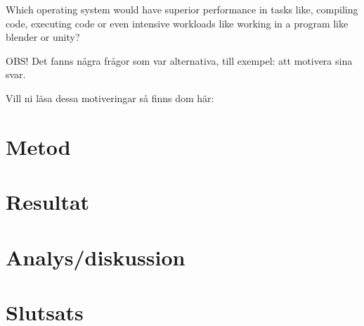 \documentclass[a4paper, 12pt]{report}
\begin{document}
    \cite{form}
    \vspace{1cm}

    \large {Which operating system would have superior performance in tasks like, compiling code, executing code or even intensive workloads like working in a program  like blender or unity?}

    \vspace{.5cm}



    \cite{form}

    \vspace{1cm}


    \small{OBS! Det fanns några frågor som var alternativa, till exempel: att motivera sina svar.
    
    Vill ni läsa dessa motiveringar så finns dom här:} 


\section{Metod}



\section{Resultat}

\section{Analys/diskussion}



\section{Slutsats}


\printbibliography
\end{document}
